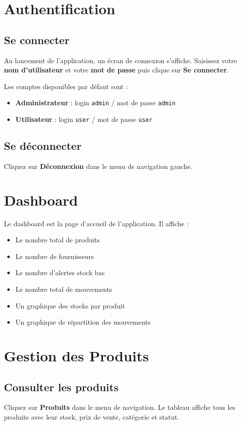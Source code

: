 \documentclass[12pt, a4paper]{article}
\begin{document}
	\section{Authentification}
	\subsection{Se connecter}
	Au lancement de l'application, un écran de connexion s'affiche. Saisissez votre \textbf{nom d'utilisateur} et votre \textbf{mot de passe} puis clique sur \textbf{Se connecter}.
	
	Les comptes disponibles par défaut sont :
	\begin{itemize}
		\item \textbf{Administrateur} : login \texttt{admin} / mot de passe \texttt{admin}
		\item \textbf{Utilisateur} : login \texttt{user} / mot de passe \texttt{user}
	\end{itemize}
	
	\subsection{Se déconnecter}
	Cliquez sur \textbf{Déconnexion} dans le menu de navigation gauche.
	
	\section{Dashboard}
	Le dashboard est la page d'accueil de l'application. Il affiche :
	\begin{itemize}
		\item Le nombre total de produits
		\item Le nombre de fournisseurs
		\item Le nombre d'alertes stock bas
		\item Le nombre total de mouvements
		\item Un graphique des stocks par produit
		\item Un graphique de répartition des mouvements
	\end{itemize}
	
	\section{Gestion des Produits}
	\subsection{Consulter les produits}
	Cliquez sur \textbf{Produits} dans le menu de navigation. Le tableau affiche tous les produits avec leur stock, prix de vente, catégorie et statut.
	
\end{document}
